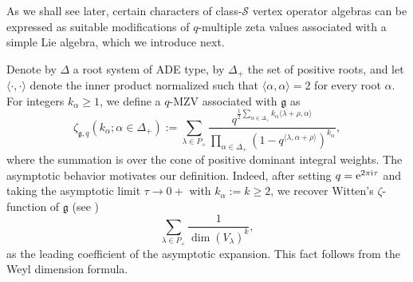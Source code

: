 \documentclass[pdftex]{sigma}
\numberwithin{equation}{section}
\theoremstyle{definition}
\begin{document}
As we shall see later, certain characters of class-$\mathcal{S}$ vertex operator algebras can be expressed as suitable modifications of $q$-multiple zeta values associated with a simple Lie algebra, which we introduce next.

Denote by $\Delta$ a root system of ADE type, by $\Delta_+$ the set of positive roots, and let $\langle \cdot, \cdot \rangle$ denote the inner product normalized
such that $\langle \alpha,\alpha \rangle=2$ for every root $\alpha$. For integers $k_\alpha \geq 1$, we define a $q$-MZV associated with $\mathfrak{g}$ as
\begin{equation} \label{qmzvg}
\zeta_{\mathfrak{g},q}(k_\alpha; \alpha \in \Delta_+):=\sum_{\lambda \in P_+} \frac{q^{\frac12 \sum_{\alpha \in \Delta_+} k_\alpha \langle\lambda+\rho,\alpha \rangle}}{\prod_{\alpha \in \Delta_+} (1-q^{\langle \lambda, \alpha+\rho\rangle})^{k_\alpha}},
\end{equation}
where the summation is over the cone of positive dominant integral weights. The asymptotic behavior motivates our definition. Indeed, after setting $q={\rm e}^{2\pi {\rm i}\tau}$ and taking the asymptotic limit $\tau \to 0+$ with
$k_{\alpha}:=k \geq 2$, we recover
Witten's $\zeta$-function of $\mathfrak{g}$ (see \cite{Zagier})
\[
\sum_{\lambda \in P_+} \frac{1}{\dim (V_\lambda)^k},
\]
 as the leading coefficient of the asymptotic expansion. This fact follows from the Weyl dimension formula.
\end{document}
